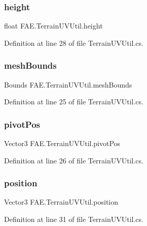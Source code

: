 \subsubsection{height}
{\footnotesize\ttfamily float F\+A\+E.\+Terrain\+U\+V\+Util.\+height}



Definition at line 28 of file Terrain\+U\+V\+Util.\+cs.

\mbox{\label{class_f_a_e_1_1_terrain_u_v_util_a176adad5a3e0cb65d1e92dbd62d86d61}} 
\subsubsection{mesh\+Bounds}
{\footnotesize\ttfamily Bounds F\+A\+E.\+Terrain\+U\+V\+Util.\+mesh\+Bounds}



Definition at line 25 of file Terrain\+U\+V\+Util.\+cs.

\mbox{\label{class_f_a_e_1_1_terrain_u_v_util_ac221d773dc6e418f3f6cc38daeea32f8}} 
\subsubsection{pivot\+Pos}
{\footnotesize\ttfamily Vector3 F\+A\+E.\+Terrain\+U\+V\+Util.\+pivot\+Pos}



Definition at line 26 of file Terrain\+U\+V\+Util.\+cs.

\mbox{\label{class_f_a_e_1_1_terrain_u_v_util_abd53c055d5bd0557097a2c5fe70263ae}} 
\subsubsection{position}
{\footnotesize\ttfamily Vector3 F\+A\+E.\+Terrain\+U\+V\+Util.\+position}



Definition at line 31 of file Terrain\+U\+V\+Util.\+cs.

